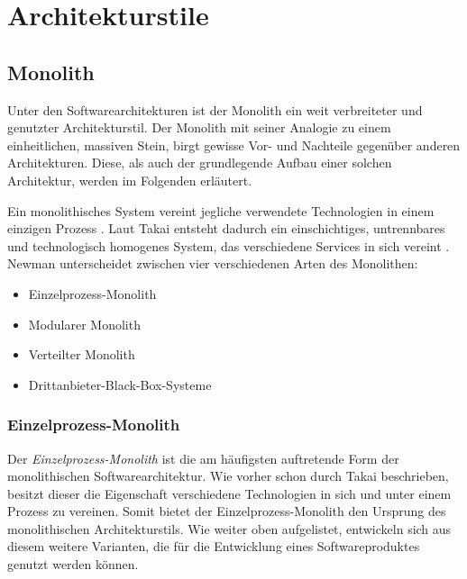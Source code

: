 \section{Architekturstile}
\label{sec:architekturstile}
    \subsection{Monolith}
    \label{subsec:monolith}

    Unter den Softwarearchitekturen ist der Monolith ein weit verbreiteter und genutzter Architekturstil. Der Monolith mit seiner Analogie zu einem einheitlichen, massiven Stein, birgt gewisse Vor- und Nachteile gegenüber anderen Architekturen. Diese, als auch der grundlegende Aufbau einer solchen Architektur, werden im Folgenden erläutert.

    Ein monolithisches System vereint jegliche verwendete Technologien in einem einzigen Prozess \parencites{newman2019monolith}[S. 21]{gallipeau2018microservices}. Laut Takai entsteht dadurch \glqq [...] ein einschichtiges, untrennbares und technologisch homogenes System, das verschiedene Services in sich vereint\grqq{} \parencite[S. 17]{takai2017architektur}. Newman unterscheidet zwischen vier verschiedenen Arten des Monolithen:%

    \begin{itemize}
        \item Einzelprozess-Monolith
        \item Modularer Monolith
        \item Verteilter Monolith
        \item Drittanbieter-Black-Box-Systeme
    \end{itemize}
    
    \subsubsection{Einzelprozess-Monolith}
    Der \emph{Einzelprozess-Monolith} ist die am häufigsten auftretende Form der monolithischen Softwarearchitektur. Wie vorher schon durch Takai beschrieben, besitzt dieser die Eigenschaft verschiedene Technologien in sich und unter einem Prozess zu vereinen. Somit bietet der Einzelprozess-Monolith den Ursprung des monolithischen Architekturstils. Wie weiter oben aufgelistet, entwickeln sich aus diesem weitere Varianten, die für die Entwicklung eines Softwareproduktes genutzt werden können.
    
